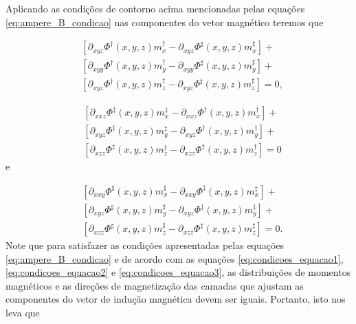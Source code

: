 Aplicando as condições de contorno acima mencionadas pelas equações \ref{eq:ampere_B_condicao} nas componentes do vetor magnético teremos que

\begin{equation}
\begin{split}
&[\partial_{xyz} \Phi^{\dagger}(x, y, z) m_{x}^{\dagger} - \partial_{xyz} \Phi^{\sharp}(x, y, z) m_{x}^{\sharp}] + \:
\\ 
&[\partial_{xyy} \Phi^{\dagger}(x, y, z) m_{y}^{\dagger} - \partial_{xyy} \Phi^{\sharp}(x, y, z) m_{y}^{\sharp}] + \:
\\ 
&[\partial_{xyz} \Phi^{\dagger}(x, y, z) m_{z}^{\dagger} - \partial_{xyz} \Phi^{\sharp}(x, y, z) m_{z}^{\sharp}] = 0,
\end{split}
\label{eq:condicoes_equacao1}
\end{equation}

\begin{equation}
\begin{split}
&[\partial_{xxz} \Phi^{\ddagger}(x, y, z) m_{x}^{\ddagger} - \partial_{xxz} \Phi^{\dagger}(x, y, z) m_{x}^{\dagger}] + 
\\ 
&[\partial_{xyz} \Phi^{\ddagger}(x, y, z) m_{y}^{\ddagger} - \partial_{xyz} \Phi^{\dagger}(x, y, z) m_{y}^{\dagger}] + 
\\ 
&[\partial_{xzz} \Phi^{\ddagger}(x, y, z) m_{z}^{\ddagger} - \partial_{xzz} \Phi^{\dagger}(x, y, z) m_{z}^{\dagger}]= 0 
\end{split}
\label{eq:condicoes_equacao2}
\end{equation}
e

\begin{equation}
\begin{split}
&[\partial_{xxy} \Phi^{\sharp}(x, y, z) m_{x}^{\sharp} - \partial_{xxy} \Phi^{\ddagger}(x, y, z) m_{x}^{\ddagger}] + 
\\ 
&[\partial_{xyz} \Phi^{\sharp}(x, y, z) m_{y}^{\sharp} - \partial_{xyz} \Phi^{\ddagger}(x, y, z) m_{y}^{\ddagger}] + 
\\
&[\partial_{xzz} \Phi^{\sharp}(x, y, z) m_{z}^{\sharp} - \partial_{xzz} \Phi^{\ddagger}(x, y, z) m_{z}^{\ddagger}]  = 0.
\end{split}
\label{eq:condicoes_equacao3}
\end{equation}
Note que para satisfazer as condições apresentadas pelas equações \ref{eq:ampere_B_condicao} e de acordo com as equações \ref{eq:condicoes_equacao1}, \ref{eq:condicoes_equacao2} e \ref{eq:condicoes_equacao3}, as distribuições de momentos magnéticos e as direções de magnetização das camadas que ajustam as componentes do vetor de indução magnética devem ser iguais. Portanto, isto nos leva que 

